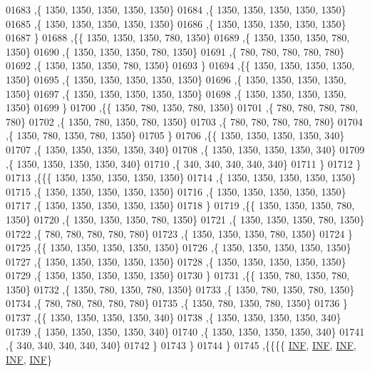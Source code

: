 \begin{DoxyCode}
01683    ,\{  1350,  1350,  1350,  1350,  1350\}
01684    ,\{  1350,  1350,  1350,  1350,  1350\}
01685    ,\{  1350,  1350,  1350,  1350,  1350\}
01686    ,\{  1350,  1350,  1350,  1350,  1350\}
01687    \}
01688   ,\{\{  1350,  1350,  1350,   780,  1350\}
01689    ,\{  1350,  1350,  1350,   780,  1350\}
01690    ,\{  1350,  1350,  1350,   780,  1350\}
01691    ,\{   780,   780,   780,   780,   780\}
01692    ,\{  1350,  1350,  1350,   780,  1350\}
01693    \}
01694   ,\{\{  1350,  1350,  1350,  1350,  1350\}
01695    ,\{  1350,  1350,  1350,  1350,  1350\}
01696    ,\{  1350,  1350,  1350,  1350,  1350\}
01697    ,\{  1350,  1350,  1350,  1350,  1350\}
01698    ,\{  1350,  1350,  1350,  1350,  1350\}
01699    \}
01700   ,\{\{  1350,   780,  1350,   780,  1350\}
01701    ,\{   780,   780,   780,   780,   780\}
01702    ,\{  1350,   780,  1350,   780,  1350\}
01703    ,\{   780,   780,   780,   780,   780\}
01704    ,\{  1350,   780,  1350,   780,  1350\}
01705    \}
01706   ,\{\{  1350,  1350,  1350,  1350,   340\}
01707    ,\{  1350,  1350,  1350,  1350,   340\}
01708    ,\{  1350,  1350,  1350,  1350,   340\}
01709    ,\{  1350,  1350,  1350,  1350,   340\}
01710    ,\{   340,   340,   340,   340,   340\}
01711    \}
01712   \}
01713  ,\{\{\{  1350,  1350,  1350,  1350,  1350\}
01714    ,\{  1350,  1350,  1350,  1350,  1350\}
01715    ,\{  1350,  1350,  1350,  1350,  1350\}
01716    ,\{  1350,  1350,  1350,  1350,  1350\}
01717    ,\{  1350,  1350,  1350,  1350,  1350\}
01718    \}
01719   ,\{\{  1350,  1350,  1350,   780,  1350\}
01720    ,\{  1350,  1350,  1350,   780,  1350\}
01721    ,\{  1350,  1350,  1350,   780,  1350\}
01722    ,\{   780,   780,   780,   780,   780\}
01723    ,\{  1350,  1350,  1350,   780,  1350\}
01724    \}
01725   ,\{\{  1350,  1350,  1350,  1350,  1350\}
01726    ,\{  1350,  1350,  1350,  1350,  1350\}
01727    ,\{  1350,  1350,  1350,  1350,  1350\}
01728    ,\{  1350,  1350,  1350,  1350,  1350\}
01729    ,\{  1350,  1350,  1350,  1350,  1350\}
01730    \}
01731   ,\{\{  1350,   780,  1350,   780,  1350\}
01732    ,\{  1350,   780,  1350,   780,  1350\}
01733    ,\{  1350,   780,  1350,   780,  1350\}
01734    ,\{   780,   780,   780,   780,   780\}
01735    ,\{  1350,   780,  1350,   780,  1350\}
01736    \}
01737   ,\{\{  1350,  1350,  1350,  1350,   340\}
01738    ,\{  1350,  1350,  1350,  1350,   340\}
01739    ,\{  1350,  1350,  1350,  1350,   340\}
01740    ,\{  1350,  1350,  1350,  1350,   340\}
01741    ,\{   340,   340,   340,   340,   340\}
01742    \}
01743   \}
01744  \}
01745 ,\{\{\{\{   \mbox{\hyperlink{1_88_84__epars_8h_a12c2040f25d8e3a7b9e1c2024c618cb6}{INF}},   \mbox{\hyperlink{1_88_84__epars_8h_a12c2040f25d8e3a7b9e1c2024c618cb6}{INF}},   \mbox{\hyperlink{1_88_84__epars_8h_a12c2040f25d8e3a7b9e1c2024c618cb6}{INF}},   \mbox{\hyperlink{1_88_84__epars_8h_a12c2040f25d8e3a7b9e1c2024c618cb6}{INF}},   \mbox{\hyperlink{1_88_84__epars_8h_a12c2040f25d8e3a7b9e1c2024c618cb6}{INF}}\}

\end{DoxyCode}

